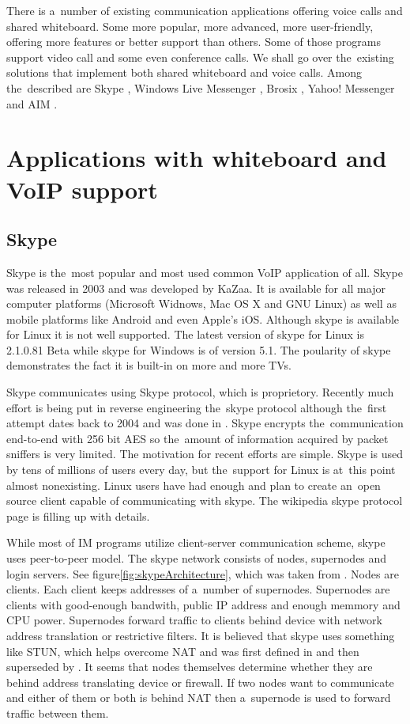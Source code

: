 There is a~number of existing communication applications offering voice calls and shared whiteboard. Some more popular, more advanced, more user-friendly, offering more features or better support than others. Some of those programs support video call and some even conference calls. We shall go over the~existing solutions that implement both shared whiteboard and voice calls. Among the~described are Skype \cite{skype}, Windows Live Messenger \cite{WindowsLiveMessenger}, Brosix \cite{brosix}, Yahoo! Messenger \cite{yahoo} and AIM \cite{AIM}.

\section{Applications with whiteboard and VoIP support}
\subsection*{Skype}
Skype is the~most popular and most used common VoIP application of all. Skype was released in 2003 and was developed by KaZaa\cite{kazaa}. It is available for all major computer platforms (Microsoft Widnows, Mac OS X and GNU Linux) as well as mobile platforms like Android and even Apple's iOS. Although skype is available for Linux it is not well supported. The latest version of skype for Linux is 2.1.0.81 Beta while skype for Windows is of version 5.1. The poularity of skype demonstrates the fact it is built-in on more and more TVs.

Skype communicates using Skype protocol, which is proprietory. Recently much effort is being put in reverse engineering the~skype protocol although the~first attempt dates back to 2004 and was done in \cite{skypeProtocolAnalysis}. Skype encrypts the~communication end-to-end with 256 bit AES so the~amount of information acquired by packet sniffers is very limited. The motivation for recent efforts are simple. Skype is used by tens of millions of users every day, but the~support for Linux is at~this point almost nonexisting. Linux users have had enough and plan to create an~open source client capable of communicating with skype. The wikipedia skype protocol page\cite{wikipediaSkypeProtocol} is filling up with details.  

While most of IM programs utilize client-server communication scheme, skype uses peer-to-peer model. The skype network consists of nodes, supernodes and login servers. See figure\ref{fig:skypeArchitecture}, which was taken from \cite{skypeProtocolAnalysis}. Nodes are clients. Each client keeps addresses of a~number of supernodes. Supernodes are clients with good-enough bandwith, public IP address and enough memmory and CPU power. Supernodes forward traffic to clients behind device with network address translation or restrictive filters. It is believed that skype uses something like STUN, which helps overcome NAT and was first defined in \cite{STUNRFC} and then superseded by \cite{STUNRFCNEW}. It seems that nodes themselves determine whether they are behind address translating device or firewall. If two nodes want to communicate and either of them or both is behind NAT then a~supernode is used to forward traffic between them. 

